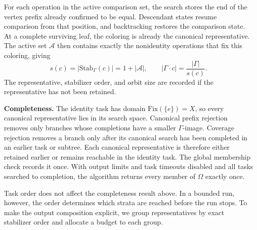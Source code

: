 \documentclass[a5paper, 10pt]{article}
\begin{document}
For each operation in the active comparison set, the search stores the end of the vertex prefix already confirmed to be equal. Descendant states resume comparison from that position, and backtracking restores the comparison state. At a complete surviving leaf, the coloring is already the canonical representative. The active set $\mathcal{A}$ then contains exactly the nonidentity operations that fix this coloring, giving
\begin{equation}
 s(c)=|\mathrm{Stab}_{\Gamma}(c)|=1+|\mathcal{A}|,
 \qquad |\Gamma\cdot c|=\frac{|\Gamma|}{s(c)}.
\label{eq:active_stabilizer}
\end{equation}
The representative, stabilizer order, and orbit size are recorded if the representative has not been retained.

\medskip
\noindent\textbf{Completeness.}
The identity task has domain $\mathrm{Fix}(\{e\})=X$, so every canonical representative lies in its search space. Canonical prefix rejection removes only branches whose completions have a smaller $\Gamma$-image. Coverage rejection removes a branch only after its canonical search has been completed in an earlier task or subtree. Each canonical representative is therefore either retained earlier or remains reachable in the identity task. The global membership check records it once. With output limits and task timeouts disabled and all tasks searched to completion, the algorithm returns every member of $\Omega$ exactly once.

Task order does not affect the completeness result above. In a bounded run, however, the order determines which strata are reached before the run stops. To make the output composition explicit, we group representatives by exact stabilizer order and allocate a budget to each group.
\end{document}
